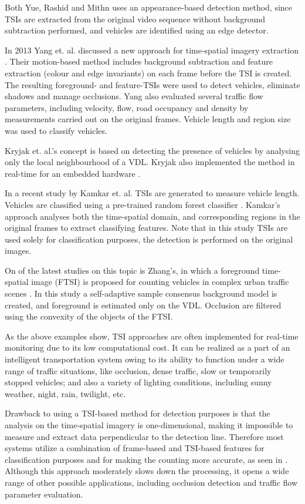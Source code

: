 Both Yue, Rashid and Mithn uses an appearance-based detection method, since TSIs are extracted from the original video sequence without background subtraction performed, and vehicles are identified using an edge detector.

In 2013 Yang et. al. discussed a new approach for time-spatial imagery extraction \cite{Yang2013a}.
Their motion-based method includes background subtraction and feature extraction (colour and edge invariants) on each frame before the TSI is created.
The resulting foreground- and feature-TSIs were used to detect vehicles, eliminate shadows and manage occlusions.
Yang also evaluated several traffic flow parameters, including velocity, flow, road occupancy and density by measurements carried out on the original frames. 
Vehicle length and region size was used to classify vehicles.

Kryjak et. al.'s concept is based on detecting the presence of vehicles by analysing only the local neighbourhood of a VDL.
Kryjak also implemented the method in real-time for an embedded hardware \cite{Kryjak2014}.

In a recent study by Kamkar et. al. TSIs are generated to measure vehicle length. Vehicles are classified using a pre-trained random forest classifier \cite{Kamkar2016}. 
Kamkar's approach analyses both the time-spatial domain, and corresponding regions in the original frames to extract classifying features.
Note that in this study TSIs are used solely for classification purposes, the detection is performed on the original images.

On of the latest studies on this topic is Zhang's, in which a foreground time-spatial image (FTSI) is proposed for counting vehicles in complex urban traffic scenes \cite{Zhang2016}.
In this study a self-adaptive sample consensus background model is created, and foreground is estimated only on the VDL.
Occlusion are filtered using the convexity of the objects of the FTSI.

As the above examples show, TSI approaches are often implemented for real-time monitoring due to its low computational cost.
It can be realized as a part of an intelligent transportation system owing to its ability to function under a wide range of traffic situations, like occlusion, dense traffic, slow or temporarily stopped vehicles; and also a variety of lighting conditions, including sunny weather, night, rain, twilight, etc.

Drawback to using a TSI-based method for detection purposes is that the analysis on the time-spatial imagery is one-dimensional, making it impossible to measure and extract data perpendicular to the detection line.
Therefore most systems utilize a combination of frame-based and TSI-based features for classification purposes and for making the counting more accurate, as seen in \cite{Kryjak2014, Yang2013a}. 
Although this approach moderately slows down the processing, it opens a wide range of other possible applications, including occlusion detection and traffic flow parameter evaluation.

